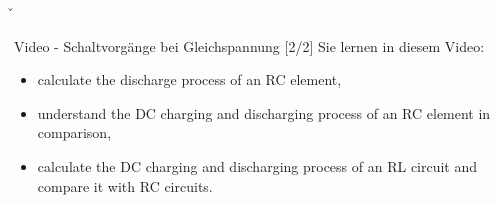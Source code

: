 \v{%
\begin{frame}
    \begin{Lernziele}{Video - Schaltvorgänge bei Gleichspannung [2/2]}
        Sie lernen in diesem Video:
        \begin{itemize}\b{\setlength\itemsep{0.7em}}
            \item calculate the discharge process of an RC element,
            \item understand the DC charging and discharging process of an RC element in comparison,
            \item calculate the DC charging and discharging process of an RL circuit and compare it with RC circuits.
        \end{itemize}
    \end{Lernziele}
\end{frame}%

}%

